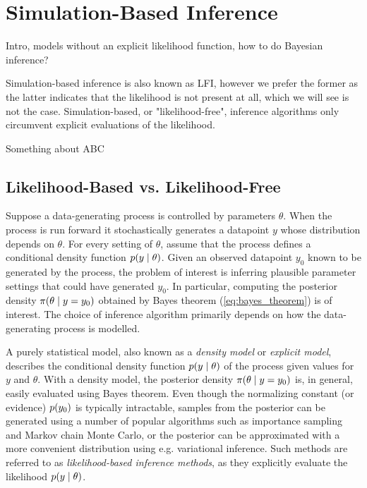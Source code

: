 


\chapter{Simulation-Based Inference}\label{chap:sbi}

Intro, models without an explicit likelihood function, how to do Bayesian inference?

Simulation-based inference is also known as LFI, however we prefer the former as the latter indicates that the likelihood is not present at all, which we will see is not the case. Simulation-based, or "likelihood-free", inference algorithms only circumvent explicit evaluations of the likelihood. 

Something about ABC

\section{Likelihood-Based vs. Likelihood-Free}

Suppose a data-generating process is controlled by parameters $\theta$. When the process is run forward it stochastically generates a datapoint $y$ whose distribution depends on $\theta$. For every setting of $\theta$, assume that the process defines a conditional density function $p \qty(y \mid \theta)$. Given an observed datapoint $y_0$ known to be generated by the process, the problem of interest is inferring plausible parameter settings that could have generated $y_0$. In particular, computing the posterior density $\pi \qty(\theta \mid y=y_0)$ obtained by Bayes theorem (\autoref{eq:bayes_theorem}) is of interest. The choice of inference algorithm primarily depends on how the data-generating process is modelled.

A purely statistical model, also known as a \textit{density model} or \textit{explicit model}, describes the conditional density function $p \qty(y \mid \theta)$ of the process given values for $y$ and $\theta$. With a density model, the posterior density $\pi \qty(\theta \mid y=y_0)$ is, in general, easily evaluated using Bayes theorem. Even though the normalizing constant (or evidence) $p\qty(y_0)$ is typically intractable, samples from the posterior can be generated using a number of popular algorithms such as importance sampling and Markov chain Monte Carlo, or the posterior can be approximated with a more convenient distribution using e.g. variational inference. Such methods are referred to as \textit{likelihood-based inference methods}, as they explicitly evaluate the likelihood $p \qty(y \mid \theta)$.

